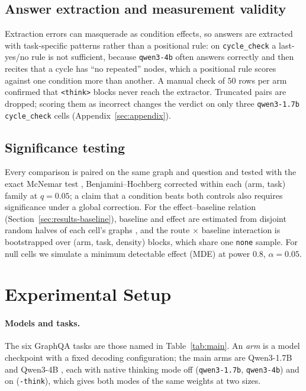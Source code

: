 \documentclass[11pt]{article}
\begin{document}
\subsection{Answer extraction and measurement validity}
\label{sec:extraction}

Extraction errors can masquerade as condition effects, so answers are
extracted with task-specific patterns rather than a positional rule: on
\texttt{cycle\_check} a last-yes/no rule is not sufficient, because
\texttt{qwen3-4b} often answers correctly and then recites that a cycle has
``no repeated'' nodes, which a positional rule scores against one condition
more than another. A manual check of $50$ rows per arm confirmed that
\texttt{<think>} blocks never reach the extractor. Truncated pairs are
dropped; scoring them as incorrect changes the verdict on only three
\texttt{qwen3-1.7b} \texttt{cycle\_check} cells
(Appendix~\ref{sec:appendix}).

\subsection{Significance testing}
\label{sec:significance}

Every comparison is paired on the same graph and question
\citep{dror2018hitchhikers} and tested with the exact McNemar test
\citep{mcnemar1947note}, Benjamini--Hochberg corrected
\citep{benjaminihochberg1995controlling} within each (arm, task)
family at $q{=}0.05$; a claim that a condition beats both controls also
requires significance under a global correction. For the effect--baseline
relation (Section~\ref{sec:results-baseline}), baseline and effect are
estimated from disjoint random halves of each cell's graphs
\citep{chernozhukov2018double}, and the route $\times$ baseline
interaction is bootstrapped over (arm, task, density) blocks, which share
one \texttt{none} sample. For null cells we simulate a
minimum detectable effect (MDE) at power $0.8$, $\alpha{=}0.05$.

\section{Experimental Setup}
\label{sec:setup}

\paragraph{Models and tasks.} The six GraphQA tasks
\citep{fatemi2023talklikeagraph} are those named in
Table~\ref{tab:main}. An \emph{arm} is a model checkpoint with a fixed
decoding configuration; the main arms are Qwen3-1.7B and Qwen3-4B
\citep{qwen2025qwen3}, each with native thinking mode off
(\texttt{qwen3-1.7b}, \texttt{qwen3-4b}) and on (\texttt{-think}), which
gives both modes of the same weights at two sizes.
\end{document}
